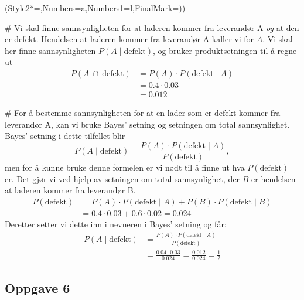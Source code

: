 \begin{easylist}[enumerate]
	\ListProperties(Style2*=,Numbers=a,Numbers1=l,FinalMark={)})
	
	
	#  Vi skal finne sannsynligheten for at laderen kommer fra leverandør A \emph{og} at den er defekt. 
	Hendelsen at laderen kommer fra leverandør A kaller vi for $A$.
	Vi skal her finne sannsynligheten $P(A \mid \text{defekt})$, og bruker produktsetningen til å regne ut
	\begin{align*}
			P(A \: \cap \: \text{defekt}) & = P(A) \cdot P(\text{defekt}  \mid A) \\
			& = 0.4 \cdot 0.03 \\
			& = 0.012
	\end{align*}
	
	# For å bestemme sannsynligheten for at en lader som er defekt kommer fra leverandør A, kan vi bruke Bayes' setning og setningen om total sannsynlighet. 
	Bayes' setning i dette tilfellet blir 
	\begin{equation*}
			P(A \mid  \text{defekt}) = \frac{P(A) \cdot P(\text{defekt} \mid A)}{P(\text{defekt})},
	\end{equation*}
	men for å kunne bruke denne formelen er vi nødt til å finne ut hva $P(\text{defekt})$ er. 
	Det gjør vi ved hjelp av setningen om total sannsynlighet, der $B$ er hendelsen at laderen kommer fra leverandør B.
	\begin{align*}
	P(\text{defekt}) & = P(A) \cdot P(\text{defekt} \mid A) + P(B) \cdot P(\text{defekt} \mid B) \\
	& = 0.4 \cdot 0.03 + 0.6 \cdot 0.02 = 0.024
	\end{align*}
	Deretter setter vi dette inn i nevneren i Bayes' setning og får:
	\begin{align*}
			P(A \mid  \text{defekt}) &= \frac{P(A) \cdot P(\text{defekt} \mid A)}{P(\text{defekt})} \\
			& = \frac{0.04 \cdot 0.03}{0.024} = \frac{0.012}{0.024} = \frac{1}{2}
	\end{align*}	
\end{easylist}


	
\subsection*{Oppgave 6}

